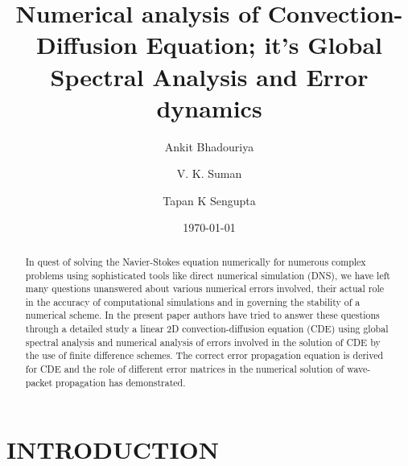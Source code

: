 \documentclass[showpacs,preprintnumbers,amsmath,amssymb]{revtex4-1} %
\begin{document}
\title[Numerical analysis of Convection-Diffusion Equation; it's Global Spectral Analysis and Error dynamics]{Numerical analysis of Convection-Diffusion Equation; it's Global Spectral Analysis and Error dynamics}

\author{Ankit Bhadouriya}

\author{V. K. Suman}

\author{Tapan K Sengupta}


\date{\today}%

\begin{abstract}
In quest of solving the Navier-Stokes equation numerically for numerous complex problems using sophisticated tools like direct numerical simulation (DNS), we have left many questions unanswered about various numerical errors involved, their actual role in the accuracy of computational simulations and in governing the stability of a numerical scheme. In the present paper authors have tried to answer these questions through a detailed study a linear 2D convection-diffusion equation (CDE) using global spectral analysis and numerical analysis of errors involved in the solution of CDE by the use of finite difference schemes. The correct error propagation equation is derived for CDE and the role of different error matrices in the numerical solution of wave-packet propagation has demonstrated.
\end{abstract} 
\maketitle

\section{INTRODUCTION} 
\end{document}
